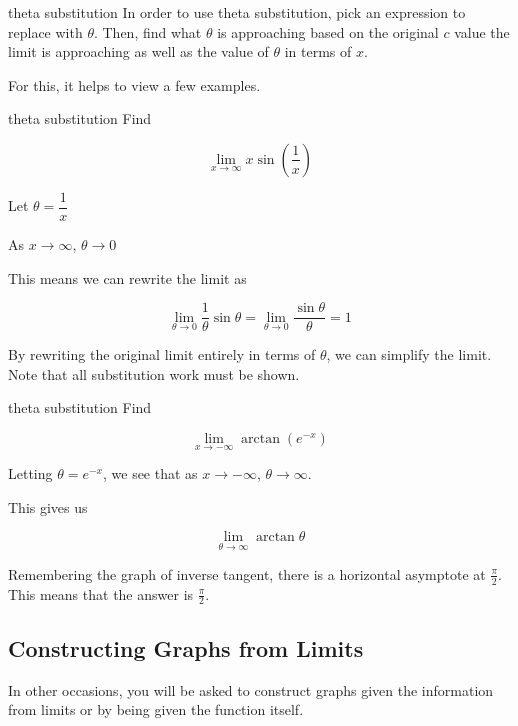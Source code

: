 \begin{definition}{theta substitution}
    In order to use theta substitution, pick an expression to replace with \( \theta \). Then, find what \( \theta \) is approaching based on the original \( c \) value the limit is approaching as well as the value of \( \theta \) in terms of \( x \).
\end{definition}

For this, it helps to view a few examples.

\begin{example}{theta substitution}
    Find
    
    \[ \lim_{x \to \infty} x \sin{\left( \dfrac{1}{x} \right)} \]
    
    Let \( \theta = \dfrac{1}{x} \)
    
    As \( x \to \infty \), \( \theta \to 0 \)
    
    This means we can rewrite the limit as
    
    \[ \lim_{\theta \to 0} \dfrac{1}{\theta} \sin{\theta} = \lim_{\theta \to 0} \dfrac{\sin{\theta}}{\theta} = 1 \]
    
    By rewriting the original limit entirely in terms of \( \theta \), we can simplify the limit. Note that all substitution work must be shown.
\end{example}

\begin{example}{theta substitution}
    Find
    
    \[ \lim_{x \to -\infty} \arctan{\left( e^{-x} \right)} \]
    
    Letting \( \theta = e^{-x} \), we see that as \( x \to -\infty \), \( \theta \to \infty \).
    
    This gives us
    
    \[ \lim_{\theta \to \infty} \arctan{\theta} \]
    
    Remembering the graph of inverse tangent, there is a horizontal asymptote at \( \frac{\pi}{2} \). This means that the answer is \( \frac{\pi}{2} \).
\end{example}

\subsection{Constructing Graphs from Limits}

In other occasions, you will be asked to construct graphs given the information from limits or by being given the function itself.

